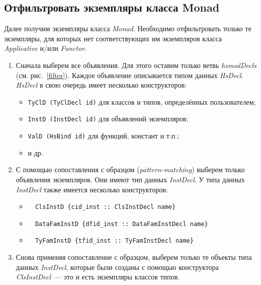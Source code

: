 \subsection{Отфильтровать экземпляры класса Monad}
Далее получим экземпляры класса \textit{Monad}. Необходимо отфильтровать только те экземпляры, для которых нет соответствующих им экземпляров класса \textit{Applicative}  и/или \textit{Functor}.
\begin{enumerate}
\item Сначала выберем все объявления. Для этого оставим только ветвь \textit{hsmodDecls} (см. рис.~\ref{filter}). Каждое объявление описывается типом данных \textit{HsDecl}. \textit{HsDecl} в свою очередь имеет несколько конструкторов:
    \begin{itemize}
        \item \lstinline{TyClD (TyClDecl id)} для классов и типов, определённых пользователем;
        \item \lstinline{InstD (InstDecl id)} для объявлений экземпляров;
        \item \lstinline{ValD (HsBind id)} для функций, констант и т.п.;
        \item и др.
    \end{itemize}
\item С помощью сопоставления с образцом (\textit{pattern-matching}) выберем только объявления экземпляров. Они имеют тип данных \textit{InstDecl}. У типа данных \textit{InstDecl} также имеется несколько конструкторов:
    \begin{itemize}
        \item \begin{lstlisting}
  ClsInstD {cid_inst :: ClsInstDecl name}
              \end{lstlisting}
        \item 
        \begin{lstlisting}
  DataFamInstD {dfid_inst :: DataFamInstDecl name} 
        \end{lstlisting}
        \item \begin{lstlisting}
  TyFamInstD {tfid_inst :: TyFamInstDecl name}
              \end{lstlisting}
    \end{itemize}
\item Снова применяя сопоставление с образцом, выберем только те объекты типа данных \textit{InstDecl}, которые были созданы с помощью конструктора \textit{ClsInstDecl}~--- это и есть экземпляры классов типов.

\end{enumerate}
